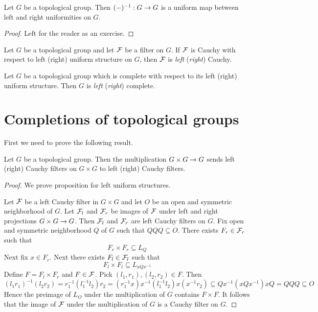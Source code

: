 \documentclass[10pt]{amsart}
\begin{document}
\begin{fact}\label{fact:inverse_is_an_isomorphism_of_left_and_right_uniform_structures}
	Let $G$ be a topological group. Then $(-)^{-1}:G\rightarrow G$ is a uniform map between left and right uniformities on $G$.
\end{fact}
\begin{proof}
	Left for the reader as an exercise.
\end{proof}

\begin{definition}
	Let $G$ be a topological group and let ${\mathcal F}$ be a filter on $G$. If ${\mathcal F}$ is Cauchy with respect to left (right) uniform structure on $G$, then ${\mathcal F}$ is \textit{left} (\textit{right}) Cauchy.
\end{definition}

\begin{definition}
	Let $G$ be a topological group which is complete with respect to its left (right) uniform structure. Then $G$ is \textit{left} (\textit{right}) complete.
\end{definition}

\section{Completions of topological groups}
\noindent
First we need to prove the following result.

\begin{proposition}\label{proposition:multiplication_preserves_one_sided_Cauchy_filters}
	Let $G$ be a topological group. Then the multiplication $G\times G\rightarrow G$ sends left (right) Cauchy filters on $G\times G$ to left (right) Cauchy filters.
\end{proposition}
\begin{proof}
	We prove proposition for left uniform structures.

	Let ${\mathcal F}$ be a left Cauchy filter in $G\times G$ and let $O$ be an open and symmetric neighborhood of $G$. Let ${\mathcal F}_l$ and ${\mathcal F}_r$ be images of ${\mathcal F}$ under left and right projections $G\times G\rightarrow G$. Then ${\mathcal F}_l$ and ${\mathcal F}_r$ are left Cauchy filters on $G$. Fix open and symmetric neighborhood $Q$ of $G$ such that $QQQ \subseteq O$. There exists $F_r \in {\mathcal F}_r$ such that
	$$F_r \times F_r \subseteq L_Q$$
	Next fix $x \in F_r$. Next there exists $F_l \in {\mathcal F}_l$ such that
	$$F_l\times F_l \subseteq L_{xQx^{-1}}$$
	Define $F = F_l\times F_r$ and $F \in {\mathcal F}$. Pick $(l_1,r_1),(l_2,r_2) \in F$. Then
	$$(l_1r_1)^{-1}(l_2r_2) = r_1^{-1}(l_1^{-1}l_2)r_2 = (r_1^{-1}x)x^{-1}(l_1^{-1}l_2)x(x^{-1}r_2) \subseteq Qx^{-1}\left(xQx^{-1}\right)xQ = QQQ \subseteq O$$
	Hence the preimage of $L_O$ under the multiplication of $G$ contains $F \times F$. It follows that the image of ${\mathcal F}$ under the multiplication of $G$ is a Cauchy filter on $G$.
\end{proof}
\end{document}
